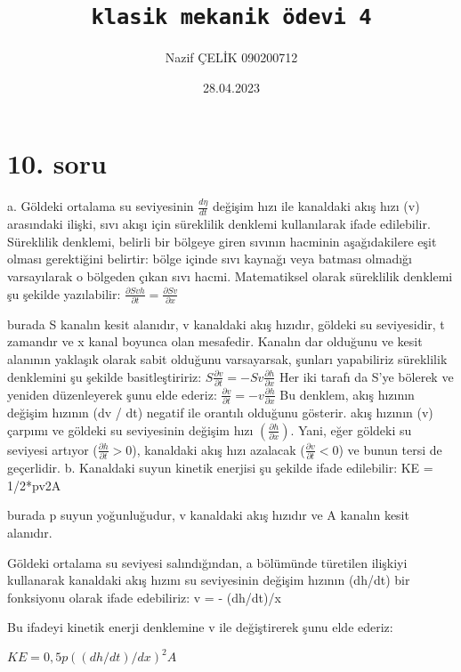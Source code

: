 \documentclass[12pt]{article}
\title{ \texttt{klasik mekanik ödevi 4}}
\author{Nazif ÇELİK 090200712}
\date{28.04.2023}
\begin{document}
\maketitle
\href{https://github.com/naxifcelik/classical-mechanics/blob/main/hw4.tex}
\newpage
\large


\newpage
\section{10. soru}
a. Göldeki ortalama su seviyesinin $\frac{d\eta }{dt}$ değişim hızı ile kanaldaki akış hızı (v) arasındaki ilişki, sıvı akışı için süreklilik denklemi kullanılarak ifade edilebilir.
Süreklilik denklemi, belirli bir bölgeye giren sıvının hacminin aşağıdakilere eşit olması gerektiğini belirtir:
bölge içinde sıvı kaynağı veya batması olmadığı varsayılarak o bölgeden çıkan sıvı hacmi.
Matematiksel olarak süreklilik denklemi şu şekilde yazılabilir:
\bigbreak
$\frac{\partial Svh}{\partial t} = \frac{\partial Sv}{\partial x}$

burada S kanalın kesit alanıdır, v kanaldaki akış hızıdır, göldeki su seviyesidir, t zamandır ve x kanal boyunca olan mesafedir. Kanalın dar olduğunu ve kesit alanının yaklaşık olarak sabit olduğunu varsayarsak, şunları yapabiliriz
süreklilik denklemini şu şekilde basitleştiririz:
\bigbreak
$ S\frac{\partial v}{\partial t}=-Sv\frac{\partial h}{\partial x}$
Her iki tarafı da S'ye bölerek ve yeniden düzenleyerek şunu elde ederiz:
\bigbreak
$ \frac{\partial v}{\partial t}=-v\frac{\partial h}{\partial x}$
\bigbreak
Bu denklem, akış hızının değişim hızının (dv / dt) negatif ile orantılı olduğunu gösterir.
akış hızının (v) çarpımı ve göldeki su seviyesinin değişim hızı $(\frac{\partial h}{\partial x})$. Yani, eğer
göldeki su seviyesi artıyor ($\frac{\partial h}{\partial t}>0$), kanaldaki akış hızı azalacak ($\frac{\partial v}{\partial t}<0$) ve bunun tersi de geçerlidir.
\bigbreak
b. Kanaldaki suyun kinetik enerjisi şu şekilde ifade edilebilir:
KE = 1/2*pv2A

burada p suyun yoğunluğudur, v kanaldaki akış hızıdır ve A kanalın kesit alanıdır.

Göldeki ortalama su seviyesi salındığından, a bölümünde türetilen ilişkiyi kullanarak kanaldaki akış hızını su seviyesinin değişim hızının (dh/dt) bir fonksiyonu olarak ifade edebiliriz:
\bigbreak
v = - (dh/dt)/x

Bu ifadeyi kinetik enerji denklemine v ile değiştirerek şunu elde ederiz:

$KE = 0,5 p ((dh/dt)/dx)^2 A$
\end{document}
